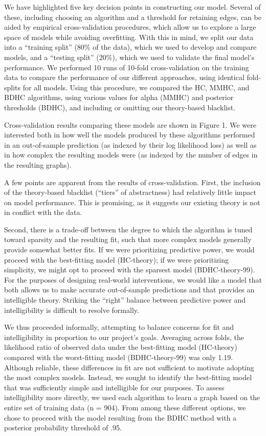 \documentclass[10pt, letterpaper]{article}
\begin{document}
We have highlighted five key decision points in constructing our model.
Several of these, including choosing an algorithm and a threshold for
retaining edges, can be aided by empirical cross-validation procedures,
which allow us to explore a large space of models while avoiding
overfitting. With this in mind, we split our data into a ``training
split'' (80\% of the data), which we used to develop and compare models,
and a ``testing split'' (20\%), which we used to validate the final
model's performance. We performed 10 runs of 10-fold cross-validation on
the training data to compare the performance of our different
approaches, using identical fold-splits for all models. Using this
procedure, we compared the HC, MMHC, and BDHC algorithms, using various
values for alpha (MMHC) and posterior thresholds (BDHC), and including
or omitting our theory-based blacklist.

Cross-validation results comparing these models are shown in Figure 1.
We were interested both in how well the models produced by these
algorithms performed in an out-of-sample prediction (as indexed by their
log likelihood loss) as well as in how complex the resulting models were
(as indexed by the number of edges in the resulting graphs).

A few points are apparent from the results of cross-validation. First,
the inclusion of the theory-based blacklist (``tiers'' of abstractness)
had relatively little impact on model performance. This is promising, as
it suggests our existing theory is not in conflict with the data.

Second, there is a trade-off between the degree to which the algorithm
is tuned toward sparsity and the resulting fit, such that more complex
models generally provide somewhat better fits. If we were prioritizing
predictive power, we would proceed with the best-fitting model
(HC-theory); if we were prioritizing simplicity, we might opt to proceed
with the sparsest model (BDHC-theory-99). For the purposes of designing
real-world interventions, we would like a model that both allows us to
make accurate out-of-sample predictions and that provides an
intelligible theory. Striking the ``right'' balance between predictive
power and intelligibility is difficult to resolve formally.

We thus proceeded informally, attempting to balance concerns for fit and
intelligibility in proportion to our project's goals. Averaging across
folds, the likelihood ratio of observed data under the best-fitting
model (HC-theory) compared with the worst-fitting model (BDHC-theory-99)
was only 1.19. Although reliable, these differences in fit are not
sufficient to motivate adopting the most complex models. Instead, we
sought to identify the best-fitting model that was sufficiently simple
and intelligible for our purposes. To assess intelligibility more
directly, we used each algorithm to learn a graph based on the entire
set of training data (n = 904). From among these different options, we
chose to proceed with the model resulting from the BDHC method with a
posterior probability threshold of .95.
\end{document}
